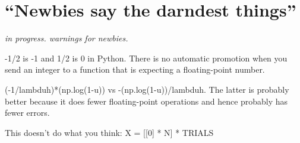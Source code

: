 \chapter{``Newbies say the darndest things''}

\begin{fullwidth}
{\em in progress.  warnings for newbies.}

-1/2 is -1 and 1/2 is 0 in Python.  There is no automatic promotion when you send an integer to a function that is expecting a floating-point number.

(-1/lambduh)*(np.log(1-u)) vs -(np.log(1-u))/lambduh. The latter is probably better because it does fewer floating-point operations and hence probably has fewer errors.

This doesn't do what you think: X = [[0] * N] * TRIALS

\end{fullwidth}
